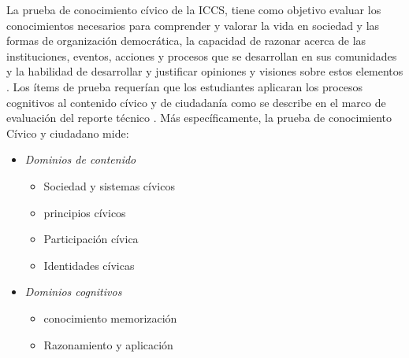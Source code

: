 \documentclass[12pt,twoside]{templates/facsothesis}
\providecommand{\tightlist}{%
  \setlength{\itemsep}{0pt}\setlength{\parskip}{0pt}}
\begin{document}
La prueba de conocimiento cívico de la ICCS, tiene como objetivo evaluar los conocimientos necesarios para comprender y valorar la vida en sociedad y las formas de organización democrática, la capacidad de razonar acerca de las instituciones, eventos, acciones y procesos que se desarrollan en sus comunidades y la habilidad de desarrollar y justificar opiniones y visiones sobre estos elementos \citep{schulz_Initial_2010}. Los ítems de prueba requerían que los estudiantes aplicaran los procesos cognitivos al contenido cívico y de ciudadanía como se describe en el marco de evaluación del reporte técnico \citep{schulz_ICCS_2016}. Más específicamente, la prueba de conocimiento Cívico y ciudadano mide:

\begin{itemize}
\tightlist
\item
  \emph{Dominios de contenido}

  \begin{itemize}
  \tightlist
  \item
    Sociedad y sistemas cívicos
  \item
    principios cívicos
  \item
    Participación cívica
  \item
    Identidades cívicas
  \end{itemize}
\item
  \emph{Dominios cognitivos}

  \begin{itemize}
  \tightlist
  \item
    conocimiento memorización
  \item
    Razonamiento y aplicación
  \end{itemize}
\end{itemize}
\end{document}

